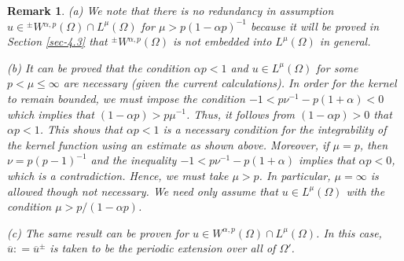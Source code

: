 \documentclass[leqno,final]{siamltex}
\numberwithin{equation}{section}
\newtheorem{remark}{Remark}[section]
\renewcommand{\(}{\bigl(}
\renewcommand{\)}{\bigr)}
\begin{document}
\begin{remark}
(a) We note that there is no redundancy in assumption 
$u \in {^{\pm}}{W}{^{\alpha,p}}(\Omega) \cap L^\mu(\Omega)$ for $\mu > p(1-\alpha p)^{-1}$ 
because it will be proved in Section \ref{sec-4.3} that ${^{\pm}}{W}{^{\alpha,p}}(\Omega)$ 	
is not embedded into $L^{\mu}(\Omega)$ in general. 

(b)  It can be proved that the condition $\alpha p < 1$ and $u \in L^{\mu}(\Omega)$ for some $p < \mu \leq \infty$ 
	are necessary (given the current  calculations). 
	In order for the kernel to remain bounded, we must impose the condition 
	$-1 < p{\nu}^{-1} -p(1+\alpha) < 0$ which implies that  $(1-\alpha p)  > p\mu^{-1}$. 
	Thus,  it follows from $(1- \alpha p) > 0$ that $\alpha p < 1$.
	This shows that $\alpha p <1$ is a necessary condition for the integrability of the kernel function 
	using an estimate as shown above. Moreover, if $\mu = p$, then $\nu = p(p-1)^{-1}$ and the inequality 
	$-1 < p{\nu}^{-1} -p(1+\alpha)$ implies that $\alpha p<0$, which is a contradiction. Hence, 
	we must take $\mu > p$. In particular, $\mu = \infty$ is allowed though not necessary. We need only assume 
	that $u \in L^{\mu}(\Omega)$ with the condition $\mu > p/(1-\alpha p)$.
	
(c) The same result can be proven for $u \in{W}^{\alpha,p}(\Omega)\cap L^{\mu}(\Omega)$. In this case, $\overline{u} : = \overline{u}^{\pm}$ is taken to be the periodic extension over all of $\Omega'$.
\end{remark}
 
\end{document}
